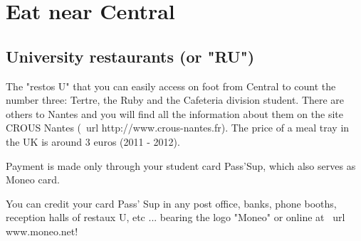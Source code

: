 \section{Eat near Central}

\subsection{University restaurants (or "RU")}


The "restos U" that you can easily access on foot from Central to count the number three: Tertre, the Ruby and the Cafeteria division student. There are others to Nantes and you will find all the information about them on the site CROUS Nantes (\ url {} http://www.crous-nantes.fr). The price of a meal tray in the UK is around 3 euros (2011 - 2012).

Payment is made only through your student card Pass'Sup, which also serves as Moneo card.

You can credit your card Pass' Sup in any post office, banks, phone booths, reception halls of restaux U, etc ... bearing the logo "Moneo" or online at \ url {www.moneo.net}!

